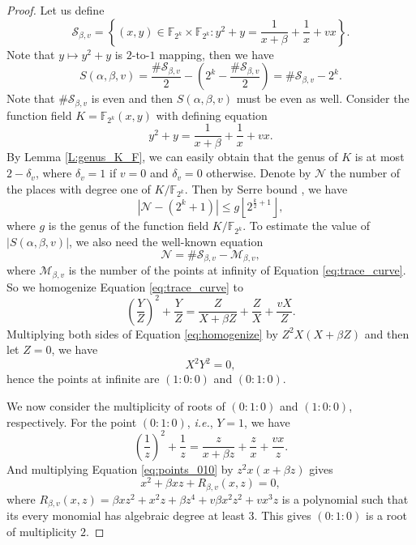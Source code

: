 \documentclass{article}
\newcommand{\F}{\mathbb{F}}
\newcommand{\0}{\textbf{0}}
\newcommand{\1}{\textbf{1}}
\theoremstyle{plain}
\begin{document}
\begin{proof}
        Let us define
        \[\mathcal{S}_{\beta,v}=\left\{(x,y)\in\F_{2^k}\times\F_{2^k} : y^2+y=\frac{1}{x+\beta}+\frac{1}{x}+vx\right\}.\]
        Note that $y\mapsto y^2+y$ is $2$-to-$1$ mapping, then we have
        \begin{equation}\label{eq:tracesum_S}
            S(\alpha,\beta,v)=\frac{\#\mathcal{S}_{\beta,v}}{2}-\left(2^k-\frac{\#\mathcal{S}_{\beta,v}}{2}\right)=\#\mathcal{S}_{\beta,v}-2^k.
        \end{equation}
        Note that $\#\mathcal{S}_{\beta,v}$ is even and then $S(\alpha,\beta,v)$ must be even as well.
        Consider the function field $K=\F_{2^k}(x,y)$ with defining equation
        \begin{equation}\label{eq:trace_curve}
            y^2+y=\frac{1}{x+\beta}+\frac{1}{x}+vx.
        \end{equation}
        By Lemma \ref{L:genus_K_F}, we can easily obtain that the genus of $K$ is at most $2-\delta_v$,
        where $\delta_v=1$ if $v=0$ and $\delta_v=0$ otherwise.
        Denote by $\mathcal{N}$ the number of the places with degree one of $K/\F_{2^k}$.
        Then by Serre bound \cite{Serre1982serrebound}, we have
        \begin{equation}\label{eq:N_genus_inequality}
            \left\lvert \mathcal{N}-(2^k+1)\right\rvert\le g\left\lfloor 2^{\frac{k}{2}+1}\right\rfloor,
        \end{equation}
        where $g$ is the genus of the function field $K/\F_{2^k}$.
        To estimate the value of $|S(\alpha,\beta,v)|$,
        we also need the well-known equation
        \begin{equation}\label{eq:N_S_M_equality}
            \mathcal{N}=\#\mathcal{S}_{\beta,v}-\mathcal{M}_{\beta,v},
        \end{equation}
        where $\mathcal{M}_{\beta,v}$ is the number of the points at infinity of Equation \eqref{eq:trace_curve}.
        So we homogenize Equation \eqref{eq:trace_curve} to
        \begin{equation}\label{eq:homogenize}
            \left( \frac{Y}{Z} \right)^2+\frac{Y}{Z}=\frac{Z}{X+\beta Z}+\frac{Z}{X}+\frac{vX}{Z}.
        \end{equation}
        Multiplying both sides of Equation \eqref{eq:homogenize} by $Z^2X\left( X+\beta Z \right)$ and then let $Z=0$,
        we have
        \[X^2Y^2=0,\]
        hence the points at infinite are $(1:0:0)$ and $(0:1:0)$.

        We now consider the multiplicity of roots of $(0 : 1 : 0)$ and $(1 : 0 : 0)$, respectively.
        For the point $(0 : 1 : 0 )$, \emph{i.e.}, $Y = 1$, we have
        \begin{equation}\label{eq:points_010}
            \left( \frac{1}{z} \right)^2+\frac{1}{z}=\frac{z}{x+\beta z}+\frac{z}{x}+\frac{vx}{z}.
        \end{equation}
        And multiplying Equation \eqref{eq:points_010} by $z^2x(x+\beta z)$ gives
        \[x^2+\beta xz+R_{\beta,v}(x,z)=0,\]
        where $R_{\beta,v}(x,z)=\beta xz^2+x^2z+\beta z^4+v\beta x^2z^2+vx^3z$ is a polynomial
        such that its every monomial has algebraic degree at least $3$.
        This gives $(0 : 1 : 0)$ is a root of multiplicity $2$.


\end{proof}
\end{document}
